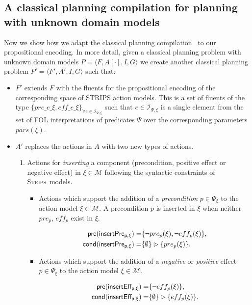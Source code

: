 \documentclass{article}
\newcommand{\tup}[1]{{\langle #1 \rangle}}
\newcommand{\pre}{\mathsf{pre}}     %
\newcommand{\cond}{\mathsf{cond}}   %
\newcommand{\strips}{\textsc{Strips}}
\begin{document}
\subsection{A classical planning compilation for planning with unknown domain models}
Now we show how we adapt the classical planning compilation~\cite{aineto2018learning} to our propositional encoding. In more detail, given a classical planning problem with unknown domain models $P=\tup{F,A[\cdot],I,G}$ we create another classical planning problem $P'=\tup{F',A',I,G}$ such that:
\begin{itemize}
\item $F'$ extends $F$ with the fluents for the propositional encoding of the corresponding space of STRIPS action models. This is a set of fluents of the type $\{pre\_e\_\xi, eff\_e\_\xi\}_{\forall e\in{\mathcal I}_{\Psi,\xi}}$ such that $e\in{\mathcal I}_{\Psi,\xi}$ is a single element from the set of FOL interpretations of predicates $\Psi$ over the corresponding parameters $pars(\xi)$. 

\item $A'$ replaces the actions in $A$ with two new types of actions.
\begin{enumerate}
\item Actions for {\em inserting} a component (precondition, positive effect or negative effect) in $\xi \in \mathcal{M}$ following the syntactic constraints of \strips\ models. 
\begin{itemize}
\item Actions which support the addition of a {\em precondition} $p\in \Psi_{\xi}$ to the action model $\xi\in\mathcal{M}$. A precondition $p$ is inserted in $\xi$ when neither $pre_p$, $eff_p$ exist in $\xi$.

\begin{small}
\begin{align*}
\hspace*{7pt}\pre(\mathsf{insertPre_{p,\xi}})=&\{\neg pre_{p}(\xi), \neg eff_{p}(\xi)\},\\
\cond(\mathsf{insertPre_{p,\xi}})=&\{\emptyset\}\rhd\{pre_{p}(\xi)\}.
\end{align*}
\end{small}

\item Actions which support the addition of a {\em negative} or {\em positive} effect $p\in \Psi_{\xi}$ to the action model $\xi\in\mathcal{M}$. 

\begin{small}
\begin{align*}
\hspace*{7pt}\pre(\mathsf{insertEff_{p,\xi}})=&\{\neg eff_{p}(\xi)\},\\
\cond(\mathsf{insertEff_{p,\xi}})=&\{\emptyset\}\rhd\{eff_{p}(\xi)\}.
\end{align*}
\end{small}
\end{itemize}


\end{enumerate}
\end{itemize}
\end{document}
